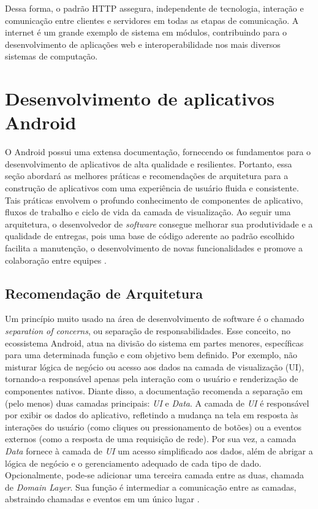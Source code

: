 Dessa forma, o padrão HTTP assegura, independente de tecnologia, interação e comunicação entre clientes e servidores em todas as 
etapas de comunicação. A internet é um grande exemplo de sistema em módulos, contribuindo para o desenvolvimento de aplicações web e 
interoperabilidade nos mais diversos sistemas de computação.

\section{Desenvolvimento de aplicativos Android}

O Android possui uma extensa documentação, fornecendo os fundamentos para o desenvolvimento de 
aplicativos de alta qualidade e resilientes. Portanto, essa seção abordará as melhores práticas e recomendações
de arquitetura para a construção de aplicativos com uma experiência de usuário fluida e consistente. Tais práticas envolvem o profundo
conhecimento de componentes de aplicativo, fluxos de trabalho e ciclo de vida da camada de visualização. Ao seguir uma arquitetura, 
o desenvolvedor de \textit{software} consegue melhorar sua produtividade e a qualidade de entregas, pois uma base de código aderente ao 
padrão escolhido facilita a manutenção, o desenvolvimento de novas funcionalidades e promove a colaboração entre equipes \cite{google-developers-guideline}.

\subsection{Recomendação de Arquitetura}

Um princípio muito usado na área de desenvolvimento de software é o chamado \textit{separation of concerns}, ou separação de responsabilidades. Esse conceito, no ecossistema Android,
atua na divisão do sistema em partes menores, específicas para uma determinada função e com objetivo bem definido. Por exemplo, não misturar lógica de 
negócio ou acesso aos dados na camada de visualização (UI), tornando-a  responsável apenas pela interação com o usuário e renderização de componentes nativos. Diante disso, a documentação recomenda a separação em (pelo menos)
duas camadas principais: \textit{UI} e \textit{Data}. A camada de \textit{UI} é responsável por exibir os dados do aplicativo, refletindo a mudança na tela em resposta às
interações do usuário (como cliques ou pressionamento de botões) ou a eventos externos (como a resposta de uma requisição de rede). Por sua vez, a camada \textit{Data} fornece à camada de \textit{UI} 
um acesso simplificado aos dados, além de abrigar a lógica de negócio e o gerenciamento adequado de cada tipo de dado. Opcionalmente, pode-se adicionar uma terceira camada entre as duas, chamada de \textit{Domain Layer}.
Sua função é intermediar a comunicação entre as camadas, abstraindo chamadas e eventos em um único lugar \cite{google-developers-guideline}.

